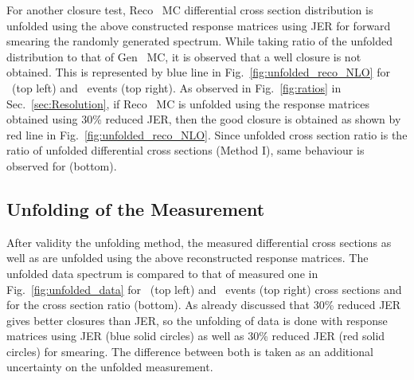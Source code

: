 For another closure test, Reco \MGP~MC differential cross section distribution is unfolded using the above constructed response matrices using JER for forward smearing the randomly generated spectrum. While taking ratio of the unfolded distribution to that of Gen \MGP~MC, it is observed that a well closure is not obtained. This is represented by blue line in Fig.~\ref{fig:unfolded_reco_NLO} for \njt~(top left) and \njth~events (top right). As observed in Fig.~\ref{fig:ratios} in Sec.~\ref{sec:Resolution}, if Reco \MGP~MC is unfolded using the response matrices obtained using 30\% reduced JER, then the good closure is obtained as shown by red line in Fig.~\ref{fig:unfolded_reco_NLO}. Since unfolded cross section ratio \ratio is the ratio of unfolded differential cross sections (Method I), same behaviour is observed for \ratio (bottom). 

\subsection{Unfolding of the Measurement}
\label{subsec:unf}
After validity the unfolding method, the measured differential cross sections as well as \ratio are unfolded using the above reconstructed response matrices. The unfolded data spectrum is compared to that of measured one in Fig.~\ref{fig:unfolded_data} for \njt~(top left) and \njth~events (top right) cross sections and for the cross section ratio \ratio (bottom). As already discussed that 30\% reduced JER gives better closures than JER, so the unfolding of data is done with response matrices using JER (blue solid circles) as well as 30\% reduced JER (red solid circles) for smearing. The difference between both is taken as an additional uncertainty on the unfolded measurement. %

